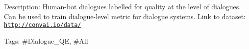 Description\+: Human-\/bot dialogues labelled for quality at the level of dialogues. Can be used to train dialogue-\/level metric for dialogue systems. Link to dataset\+: \href{http://convai.io/data/}{\tt http\+://convai.\+io/data/}

Tags\+: \#\+Dialogue\+\_\+\+QE, \#\+All 